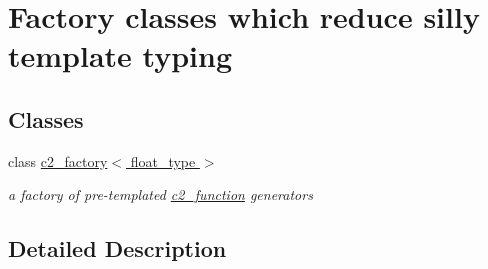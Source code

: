 \hypertarget{group__factories}{}\section{Factory classes which reduce silly template typing}
\label{group__factories}
\subsection*{Classes}
\begin{DoxyCompactItemize}
\item 
class \hyperlink{classc2__factory}{c2\+\_\+factory$<$ float\+\_\+type $>$}
\begin{DoxyCompactList}\small\item\em a factory of pre-\/templated \hyperlink{classc2__function}{c2\+\_\+function} generators \end{DoxyCompactList}\end{DoxyCompactItemize}


\subsection{Detailed Description}
